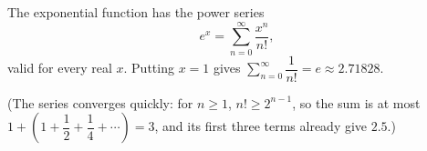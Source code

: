 The exponential function has the power series
\[e^x=\sum_{n=0}^{\infty}\dfrac{x^n}{n!},\]
valid for every real $x$. Putting $x=1$ gives $\displaystyle\sum_{n=0}^{\infty}\dfrac1{n!}=\boxed{e}\approx2.71828$.

(The series converges quickly: for $n\ge1$, $n!\ge2^{n-1}$, so the sum is at most $1+\left(1+\dfrac12+\dfrac14+\cdots\right)=3$, and its first three terms already give $2.5$.)
